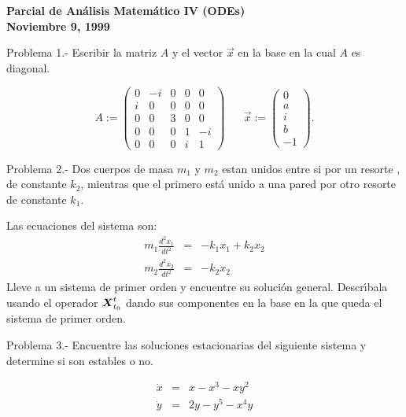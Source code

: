 \documentclass{article}
\newcommand{\ve}[1]{\mbox{\boldmath ${#1}$}}
\begin{document}
\begin{center}
 \textbf{ Parcial de An\'alisis Matem\'atico IV (ODEs) \\
Noviembre 9, 1999 }
\end{center}

Problema 1.- Escribir la matriz $A$ y el vector $\vec{x}$
en la base en la cual $A$ es diagonal.


\begin{equation}
  A := \left( 
             \begin{array}{ccccc}
               0 & -i& 0 & 0 & 0 \\
               i & 0 & 0 & 0 & 0 \\
               0 & 0 & 3 & 0 & 0 \\
               0 & 0 & 0 & 1 & -i \\
               0 & 0 & 0 & i & 1
             \end{array}
             \right) 
\;\;\;\;\;\;
 \vec{x} := \left( 
             \begin{array}{c}
               0  \\
               a  \\
               i  \\
               b  \\    
               -1 
             \end{array}
         \right).
\end{equation}


Problema 2.-
%
Dos cuerpos de masa $m_1$ y $m_2$ estan unidos entre si por un resorte , 
de constante $k_2$, mientras que el primero est\'a unido a una pared por
otro resorte de constante $k_1$.

Las ecuaciones del sistema son:
\begin{eqnarray}
  m_1\frac{d^2x_1}{dt^2} &=& -k_1 x_1 + k_2 x_2  \\
  m_2\frac{d^2x_2}{dt^2} &=& -k_2 x_2
\end{eqnarray}
Lleve a un sistema de primer orden y encuentre su soluci\'on general.
Descr\'\i{}bala usando el operador $\ve{X}^t_{t_0}$ dando sus
componentes en la base en la que queda el sistema de primer orden.

Problema 3.-
%
Encuentre las soluciones estacionarias del siguiente sistema y determine si son
estables o no.

\begin{eqnarray}
  \dot{x} &=& x - x^3 - xy^2 \\
  \dot{y} &=& 2y - y ^5 -x^4y
\end{eqnarray}
\end{document}
